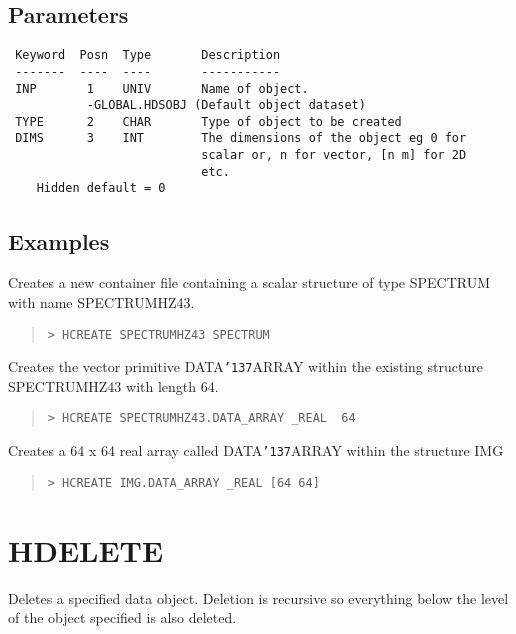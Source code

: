 \documentclass{book}
\renewcommand{\_}{{\tt\char'137}}     %
\begin{document}
\subsection{Parameters}
\begin{verbatim}
 Keyword  Posn  Type       Description
 -------  ----  ----       -----------
 INP       1    UNIV       Name of object.
           -GLOBAL.HDSOBJ (Default object dataset)
 TYPE      2    CHAR       Type of object to be created
 DIMS      3    INT        The dimensions of the object eg 0 for
                           scalar or, n for vector, [n m] for 2D
                           etc.
    Hidden default = 0

\end{verbatim}\subsection{Examples}
Creates a new container file containing a scalar structure
of type SPECTRUM with name SPECTRUMHZ43.
\begin{quote}\begin{verbatim}
> HCREATE SPECTRUMHZ43 SPECTRUM
\end{verbatim}\end{quote}
Creates the vector primitive DATA\_ARRAY within the existing
structure SPECTRUMHZ43 with length 64.
\begin{quote}\begin{verbatim}
> HCREATE SPECTRUMHZ43.DATA_ARRAY _REAL  64
\end{verbatim}\end{quote}
Creates a 64 x 64 real array called DATA\_ARRAY within the
structure IMG
\begin{quote}\begin{verbatim}
> HCREATE IMG.DATA_ARRAY _REAL [64 64]
\end{verbatim}\end{quote}
\section{HDELETE}
Deletes a specified data object. Deletion is recursive so
everything below the level of the object specified is also
deleted.
\end{document}
